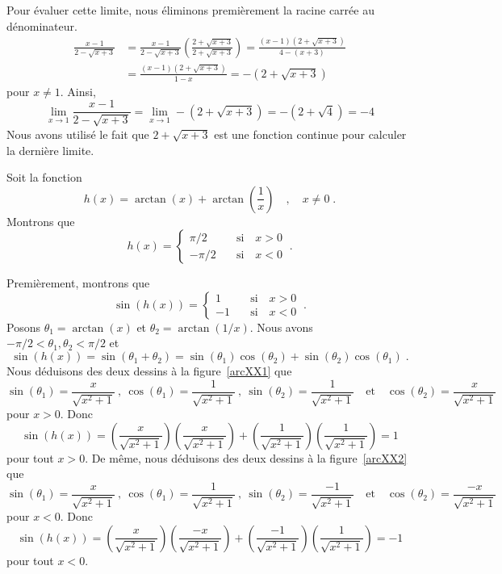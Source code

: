 {\begin{egg}
 Pour évaluer cette limite, nous éliminons premièrement la racine
carrée au dénominateur.
\begin{align*}
\frac{x-1}{2 - \sqrt{x+3}}
&= \frac{x-1}{2 - \sqrt{x+3}}
\left( \frac{2 + \sqrt{x+3}}{2 + \sqrt{x+3}} \right)
= \frac{(x-1)(2 + \sqrt{x+3})}{4 - (x+3)} \\
&= \frac{(x-1)(2 + \sqrt{x+3})}{1 - x}
= -(2 + \sqrt{x+3})
\end{align*}
pour $x \neq 1$.  Ainsi,
\[
\lim_{x\to 1} \frac{x-1}{2 - \sqrt{x+3}}
= \lim_{x\to 1}  -(2 + \sqrt{x+3}) =  -(2 + \sqrt{4}) = -4
\]
Nous avons utilisé le fait que $2 + \sqrt{x+3}$ est une fonction continue pour
calculer la dernière limite.
\end{egg}

\begin{egg}[\theory]
Soit la fonction
\[
h(x) = \arctan(x) + \arctan\left(\frac{1}{x}\right) \quad , \quad
x\neq 0 \; .
\]
Montrons que
\[
h(x) = \begin{cases}
\pi/2 & \quad \text{si} \quad x>0 \\
-\pi/2 & \quad \text{si} \quad x<0
\end{cases} \ .
\]

Premièrement, montrons que
\[
\sin(h(x)) = \begin{cases}
1 & \quad \text{si} \quad x>0 \\
-1 & \quad \text{si} \quad x<0
\end{cases} \ .
\]
Posons $\theta_1 = \arctan(x)$ et $\theta_2 = \arctan(1/x)$.  Nous avons 
$-\pi/2 < \theta_1, \theta_2 < \pi/2$ et
\[
\sin(h(x)) = \sin(\theta_1+\theta_2) = \sin(\theta_1)\cos(\theta_2)
+ \sin(\theta_2)\cos(\theta_1) \; .
\]
Nous déduisons des deux dessins à la figure~\ref{arcXX1} que
\[
\sin(\theta_1) = \frac{x}{\sqrt{x^2+1}} \ ,
\ \cos(\theta_1) = \frac{1}{\sqrt{x^2+1}} \ ,
\ \sin(\theta_2) = \frac{1}{\sqrt{x^2+1}}
\quad \text{et} \quad
\cos(\theta_2) = \frac{x}{\sqrt{x^2+1}}
\]
pour $x>0$.  Donc
\[
\sin(h(x)) = \left(\frac{x}{\sqrt{x^2+1}}\right)
\left(\frac{x}{\sqrt{x^2+1}}\right)
+ \left(\frac{1}{\sqrt{x^2+1}}\right) \left(\frac{1}{\sqrt{x^2+1}}\right) = 1
\]
pour tout $x>0$.
De même, nous déduisons des deux dessins à la figure~\ref{arcXX2} que
\[
\sin(\theta_1) = \frac{x}{\sqrt{x^2+1}} \ ,
\ \cos(\theta_1) = \frac{1}{\sqrt{x^2+1}} \ ,
\ \sin(\theta_2) = \frac{-1}{\sqrt{x^2+1}}
\quad\text{et}\quad
\cos(\theta_2) = \frac{-x}{\sqrt{x^2+1}}
\]
pour $x<0$.  Donc
\[
\sin(h(x)) = \left(\frac{x}{\sqrt{x^2+1}}\right)
\left(\frac{-x}{\sqrt{x^2+1}}\right)
+ \left(\frac{-1}{\sqrt{x^2+1}}\right) \left(\frac{1}{\sqrt{x^2+1}}\right) = -1
\]
pour tout $x<0$.


\end{egg}}
